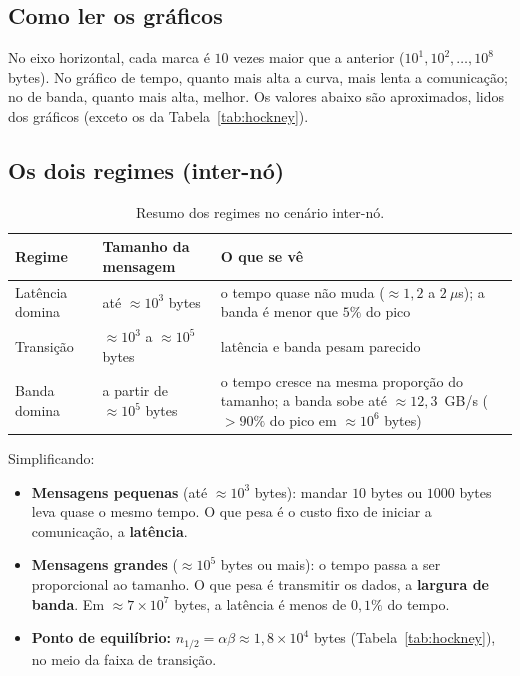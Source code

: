 \documentclass[a4paper,12pt]{article}
\begin{document}
\subsection{Como ler os gráficos}

No eixo horizontal, cada marca é $10$ vezes maior que a anterior
($10^1, 10^2, \dots, 10^8$ bytes). No gráfico de tempo, quanto mais alta a
curva, mais lenta a comunicação; no de banda, quanto mais alta, melhor.
Os valores abaixo são aproximados, lidos dos gráficos (exceto os da
Tabela~\ref{tab:hockney}).

\subsection{Os dois regimes (inter-nó)}

\begin{table}[H]
    \centering
    \begin{tabularx}{\textwidth}{@{}l l Y@{}}
    \toprule
        Regime & Tamanho da mensagem & O que se vê \\
    \midrule
        Latência domina & até $\approx 10^3$ bytes &
            o tempo quase não muda ($\approx 1{,}2$ a $2~\mu$s); a banda é
            menor que $5\%$ do pico \\
        Transição & $\approx 10^3$ a $\approx 10^5$ bytes &
            latência e banda pesam parecido \\
        Banda domina & a partir de $\approx 10^5$ bytes &
            o tempo cresce na mesma proporção do tamanho; a banda sobe até
            $\approx 12{,}3$~GB/s ($>90\%$ do pico em $\approx 10^6$ bytes) \\
    \bottomrule
    \end{tabularx}
    \caption{Resumo dos regimes no cenário inter-nó.}
    \label{tab:regimes}
\end{table}

Simplificando:
\begin{itemize}
    \item \textbf{Mensagens pequenas} (até $\approx 10^3$ bytes): mandar $10$
          bytes ou $1000$ bytes leva quase o mesmo tempo. O que pesa é o
          custo fixo de iniciar a comunicação, a \textbf{latência}.
    \item \textbf{Mensagens grandes} ($\approx 10^5$ bytes ou mais): o tempo
          passa a ser proporcional ao tamanho. O que pesa é transmitir os
          dados, a \textbf{largura de banda}. Em $\approx 7\times 10^7$ bytes,
          a latência é menos de $0{,}1\%$ do tempo.
    \item \textbf{Ponto de equilíbrio:}
          $n_{1/2}=\alpha\beta\approx 1{,}8\times 10^4$ bytes
          (Tabela~\ref{tab:hockney}), no meio da faixa de transição.
\end{itemize}
\end{document}

